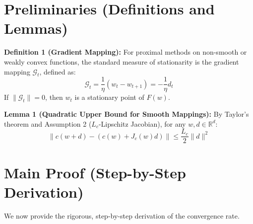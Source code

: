 \documentclass[11pt]{article}
\begin{document}
\section*{Preliminaries (Definitions and Lemmas)}

\textbf{Definition 1 (Gradient Mapping):} 
For proximal methods on non-smooth or weakly convex functions, the standard measure of stationarity is the gradient mapping $\mathcal{G}_t$, defined as:
$$\mathcal{G}_t = \frac{1}{\eta} (w_{t} - w_{t+1}) = -\frac{1}{\eta} d_t$$
If $\|\mathcal{G}_t\| = 0$, then $w_t$ is a stationary point of $F(w)$.

\textbf{Lemma 1 (Quadratic Upper Bound for Smooth Mappings):}
By Taylor's theorem and Assumption 2 ($L_c$-Lipschitz Jacobian), for any $w, d \in \mathbb{R}^d$:
$$\|c(w + d) - (c(w) + J_c(w)d)\| \leq \frac{L_c}{2} \|d\|^2$$

\section*{Main Proof (Step-by-Step Derivation)}

We now provide the rigorous, step-by-step derivation of the convergence rate.
\end{document}
